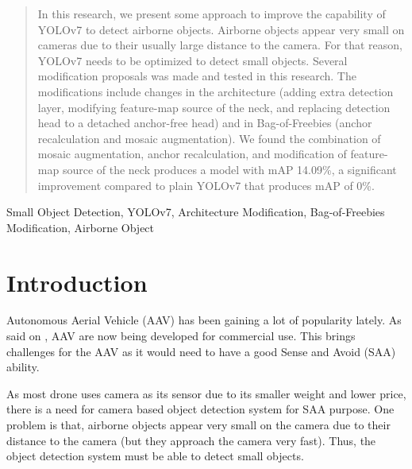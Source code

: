 \documentclass[conference]{IEEEtran}
\begin{document}
\maketitle

\begin{abstract}    
In this research, we present some approach to improve the capability of YOLOv7
to detect airborne objects. Airborne objects appear very small on cameras due
to their usually large distance to the camera. For that reason, YOLOv7 needs to
be optimized to detect small objects. Several modification proposals was made and
tested in this research. The modifications include changes in the architecture
(adding extra detection layer, modifying feature-map source of the neck,
and replacing detection head to a detached anchor-free head) and in Bag-of-Freebies
(anchor recalculation and mosaic augmentation). We found the combination of
mosaic augmentation, anchor recalculation, and modification of feature-map source of
the neck produces a model with mAP 14.09\%, a significant improvement compared
to plain YOLOv7 that produces mAP of 0\%.

\end{abstract}

\begin{IEEEkeywords}
Small Object Detection, YOLOv7, Architecture Modification, Bag-of-Freebies Modification, Airborne Object
\end{IEEEkeywords}

\section{Introduction}

Autonomous Aerial Vehicle (AAV) has been gaining a lot of popularity lately.
As said on \cite{prime_air}, AAV are now being developed for commercial use.
This brings challenges for the AAV as it would need to have a good Sense and Avoid (SAA)
ability. 

As most drone uses camera as its sensor due to its smaller weight and lower price, 
there is a need for camera based object detection system for SAA purpose.
One problem is that, airborne objects appear very small on the camera due 
to their distance to the camera (but they approach the camera very fast). Thus,
the object detection system must be able to detect small objects.
\end{document}
